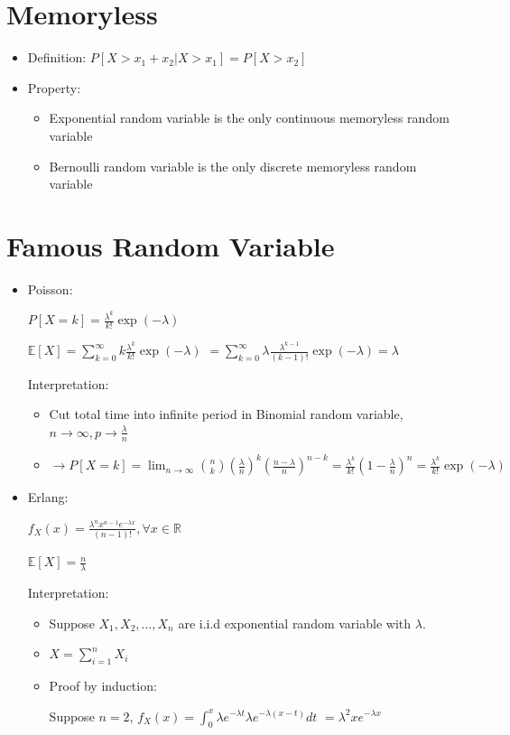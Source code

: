 \documentclass[a4paper]{article}
\begin{document}
\section{Memoryless}
\begin{itemize}
    \item Definition: $P[X > x_1 + x_2 | X > x_1] = P[X > x_2]$
    \item Property:
        \begin{itemize}
            \item Exponential random variable is the only continuous memoryless random variable
            \item Bernoulli random variable is the only discrete memoryless random variable
        \end{itemize}
\end{itemize}

\section{Famous Random Variable}
\begin{itemize}
    \item Poisson:

        $P[X=k] = \frac{\lambda^k}{k!}\exp(-\lambda)$

        $\mathbb{E}[X] = \sum_{k=0}^\infty k\frac{\lambda^k}{k!}\exp(-\lambda)$
        $= \sum_{k=0}^\infty \lambda \frac{\lambda^{k-1}}{(k-1)!}\exp(-\lambda) = \lambda$

        Interpretation:
        \begin{itemize}
            \item Cut total time into infinite period in Binomial random variable, $n \rightarrow \infty, p \rightarrow \frac{\lambda}{n}$

            \item $\rightarrow P[X=k] = \lim_{n\rightarrow \infty} \binom{n}{k}(\frac{\lambda}{n})^k(\frac{n-\lambda}{n})^{n-k} = \frac{\lambda^k}{k!}(1-\frac{\lambda}{n})^{n} = \frac{\lambda^k}{k!}\exp(-\lambda)$
        \end{itemize}
    \item Erlang:

        $f_X(x) = \frac{\lambda^n x^{n-1} e^{-\lambda x}}{(n-1)!}, \forall x \in \mathbb{R}$

        $\mathbb{E}[X] = \frac{n}{\lambda}$

        Interpretation:
        \begin{itemize}
            \item Suppose $X_1, X_2, ..., X_n$ are i.i.d exponential random variable with $\lambda$.
            \item $X = \sum_{i = 1}^n X_i$
            \item Proof by induction:

                Suppose $n = 2$, 
                $f_X(x) = \int_0^x \lambda e^{-\lambda t} \lambda e^{-\lambda(x - t)} dt$
                $= \lambda^2 x e^{-\lambda x}$
        \end{itemize}
\end{itemize}
\end{document}
